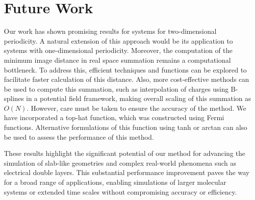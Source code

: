 \section{Future Work}
Our work has shown promising results for systems for two-dimensional periodicity. A natural extension of this approach would be its application to systems with one-dimensional periodicity. Moreover, the computation of the minimum image distance in real space summation remains a computational bottleneck. To address this, efficient techniques and functions can be explored to facilitate faster calculation of this distance. Also, more cost-effective methods can be used to compute this summation, such as interpolation of charges using B-splines in a potential field framework, making overall scaling of this summation as $O(N)$. However, care must be taken to ensure the accuracy of the method. We have incorporated a top-hat function, which was constructed using Fermi functions. Alternative formulations of this function using tanh or arctan can also be used to assess the performance of this method.

These results highlight the significant potential of our method for advancing the simulation of slab-like geometries and complex real-world phenomena such as electrical double layers. This substantial performance improvement paves the way for a broad range of applications, enabling simulations of larger molecular systems or extended time scales without compromising accuracy or efficiency. 